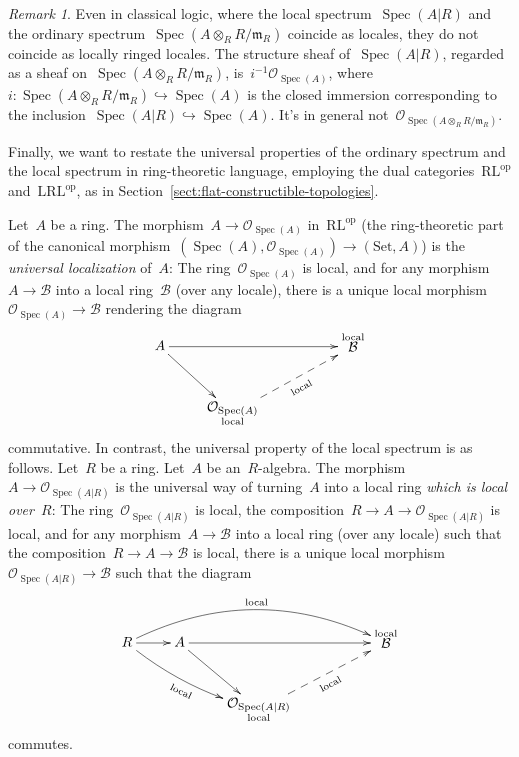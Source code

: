 \documentclass[10pt,reqno,a4paper]{amsbook}
\theoremstyle{definition}
\theoremstyle{plain}
\theoremstyle{remark}
\newtheorem{rem}[defn]{Remark}
\newcommand{\B}{\mathcal{B}}
\renewcommand{\O}{\mathcal{O}}
\newcommand{\mmm}{\mathfrak{m}}
\newcommand{\Set}{\mathrm{Set}}
\newcommand{\RL}{\mathrm{RL}}
\newcommand{\LRL}{\mathrm{LRL}}
\DeclareMathOperator{\Spec}{Spec}
\newcommand{\op}{\mathrm{op}}
\newcommand{\?}{\,{:}\,}
\renewcommand{\_}{\mathpunct{.}\,}
\begin{document}
\begin{rem}\label{rem:local-spectrum-in-classical-logic}
Even in classical logic, where the local spectrum~$\Spec(A|R)$
and the ordinary spectrum~$\Spec(A \otimes_R R/\mmm_R)$ coincide as locales,
they do not coincide as locally ringed locales. The structure sheaf
of~$\Spec(A|R)$, regarded as a sheaf on~$\Spec(A \otimes_R R/\mmm_R)$,
is~$i^{-1}\O_{\Spec(A)}$, where~$i : \Spec(A \otimes_R R/\mmm_R)
\hookrightarrow \Spec(A)$ is the closed immersion corresponding to the
inclusion~$\Spec(A|R) \hookrightarrow \Spec(A)$. It's in general
not~$\O_{\Spec(A \otimes_R R/\mmm_R)}$.
\end{rem}

Finally, we want to restate the universal properties of the ordinary spectrum
and the local spectrum in ring-theoretic language, employing the dual
categories~$\RL^\op$ and~$\LRL^\op$, as in
Section~\ref{sect:flat-constructible-topologies}.

Let~$A$ be a ring. The morphism~$A \to \O_{\Spec(A)}$ in~$\RL^\op$ (the
ring-theoretic part of the canonical morphism~$(\Spec(A), \O_{\Spec(A)}) \to
(\Set, A)$) is the \emph{universal localization} of~$A$: The
ring~$\O_{\Spec(A)}$ is local, and for any morphism~$A \to \B$ into a local
ring~$\B$ (over any locale), there is a unique local morphism~$\O_{\Spec(A)}
\to \B$ rendering the diagram
\[ \xymatrix{
  A \ar[rd] \ar[rrr] &&& {\substack{\text{local}\\\text{\normalsize$\B$}\\\phantom{\text{local}}}} \\
  & {\substack{\text{\normalsize$\O_{\Spec(A)}$}\\\text{local}}} \ar@{-->}_[@!29]{\text{local}}[rru]
} \]
commutative. In contrast, the universal property of the local spectrum is as
follows. Let~$R$ be a ring. Let~$A$ be an~$R$-algebra. The morphism~$A \to
\O_{\Spec(A|R)}$ is the universal way of turning~$A$ into a local ring
\emph{which is local over~$R$}: The ring~$\O_{\Spec(A|R)}$ is local, the
composition~$R \to A \to \O_{\Spec(A|R)}$ is local, and for any morphism~$A
\to \B$ into a local ring (over any locale) such that the composition~$R \to A
\to \B$ is local, there is a unique local morphism~$\O_{\Spec(A|R)} \to \B$
such that the diagram
\[ \xymatrix{
  R \ar[r]\ar@/^2pc/[rrrr]^{\text{local}}\ar@/_/[rrd]_[@!-26]{\text{local}} &
    A \ar[rd] \ar[rrr] &&&
    {\substack{\text{local}\\\text{\normalsize$\B$}\\\phantom{\text{local}}}} \\
  && {\substack{\text{\normalsize$\O_{\Spec(A|R)}$}\\\text{local}}} \ar@{-->}[rru]_[@!28]{\text{local}}
} \]
commutes.
\end{document}
